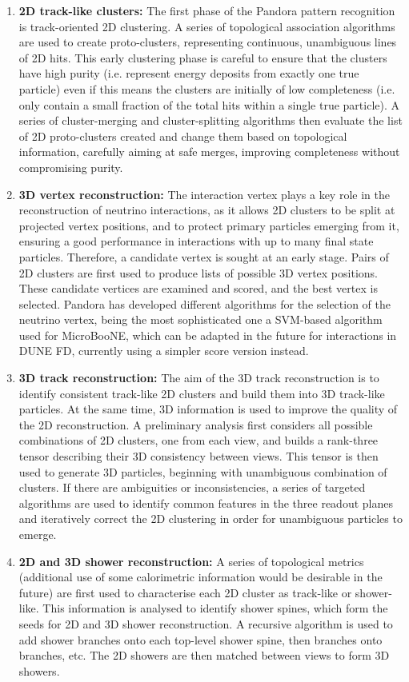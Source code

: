 \begin{enumerate}
\item{\bf 2D track-like clusters:}  The first phase of the Pandora pattern recognition is track-oriented 2D clustering. A series of topological association algorithms are used to create proto-clusters, representing continuous, unambiguous lines of 2D hits. This early clustering phase is careful to ensure that the clusters have high purity (i.e. represent energy deposits from exactly one true particle) even if this means the clusters are initially of low completeness (i.e. only contain a small fraction of the total hits within a single true particle). A series of cluster-merging and cluster-splitting algorithms then evaluate the list of 2D proto-clusters created and change them based on topological information, carefully aiming at safe merges, improving completeness without compromising purity.
\item{\bf 3D vertex reconstruction:} The interaction vertex plays a key role in the reconstruction of neutrino interactions, as it allows 2D clusters to be split at projected vertex positions, and to protect primary particles emerging from it, ensuring a good performance in interactions with up to many final state particles. Therefore, a candidate vertex is sought at an early stage. Pairs of 2D clusters are first used to produce lists of possible 3D vertex positions. These candidate vertices are examined and scored, and the best vertex is selected. Pandora has developed different algorithms for the selection of the neutrino vertex, being the most sophisticated one a SVM-based algorithm used for MicroBooNE, which can be adapted in the future for interactions in DUNE FD, currently using a simpler score version instead.  
\item{\bf 3D track reconstruction:} The aim of the 3D track reconstruction is to identify consistent track-like 2D clusters and build them into 3D track-like particles. At the same time, 3D information is used to improve the quality of the 2D reconstruction. A preliminary analysis first considers all possible combinations of 2D clusters, one from each view, and builds a rank-three tensor describing their 3D consistency between views. This tensor is then used to generate 3D particles, beginning with unambiguous combination of clusters. If there are ambiguities or inconsistencies, a series of targeted algorithms are used to identify common features in the three readout planes and iteratively correct the 2D clustering in order for unambiguous particles to emerge.
\item{\bf 2D and 3D shower reconstruction:} A series of topological metrics (additional use of some calorimetric information would be desirable in the future) are first used to characterise each 2D cluster as track-like or shower-like. This information is analysed to identify shower spines, which form the seeds for 2D and 3D shower reconstruction. A recursive algorithm is used to add shower branches onto each top-level shower spine, then branches onto branches, etc. The 2D showers are then matched between views to form 3D showers.

\end{enumerate}
